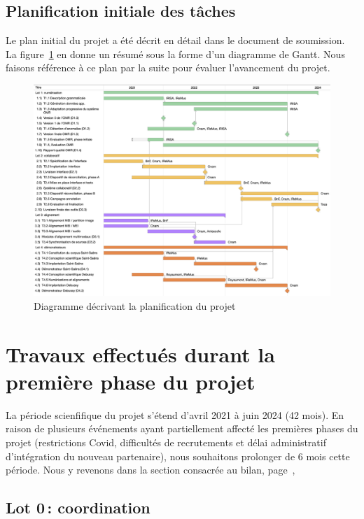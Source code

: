 \documentclass[11pt]{article}
\begin{document}
\subsection{Planification initiale des tâches}

Le plan initial du projet a été décrit en détail dans le document de soumission.
La figure~\ref{gantt} en donne un résumé sous la forme d'un diagramme de Gantt. Nous
faisons référence à ce plan par la suite pour évaluer l'avancement du projet. 


  \begin{figure}[htb]
  \begin{center}
   \includegraphics[width=\textwidth]{gantt}
    \caption{Diagramme décrivant la planification du projet}
    \label{gantt}
    \end{center}
  \end{figure}
  
\section{Travaux effectués durant la première phase du projet}

La période scienfifique du projet s'étend d'avril 2021 à juin 2024 (42 mois). En raison de plusieurs
événements ayant partiellement affecté les premières phases du projet (restrictions Covid, difficultés de 
recrutements et délai administratif d'intégration du nouveau partenaire), nous souhaitons 
prolonger de 6 mois cette période. Nous y revenons dans la section consacrée au bilan, 
page~\pageref{sec:bilan}, 

\subsection{Lot 0\,: coordination}
\end{document}
